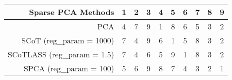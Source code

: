 \begin{tabular}{r|ccccccccc}
\toprule
{Sparse PCA Methods} &  1 &  2 &  3 &  4 &  5 &  6 &  7 &  8 &  9 \\
\midrule
PCA                        &  4 &  7 &  9 &  1 &  8 &  6 &  5 &  3 &  2 \\
SCoT (reg_param = 1000)    &  7 &  4 &  9 &  6 &  1 &  5 &  8 &  3 &  2 \\
SCoTLASS (reg_param = 1.5) &  7 &  4 &  6 &  5 &  9 &  1 &  8 &  3 &  2 \\
SPCA (reg_param = 100)     &  5 &  6 &  9 &  8 &  7 &  4 &  3 &  2 &  1 \\
\bottomrule
\end{tabular}
